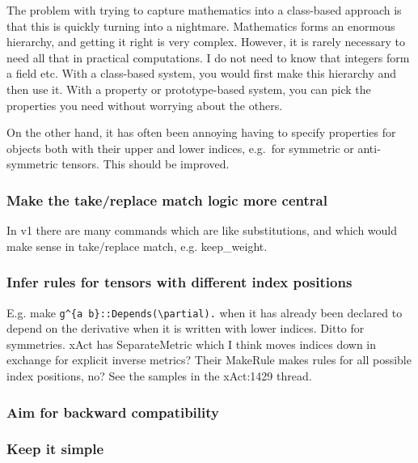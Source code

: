 \documentclass[11pt]{article}
\begin{document}
The problem with trying to capture mathematics into a class-based
approach is that this is quickly turning into a nightmare. Mathematics
forms an enormous hierarchy, and getting it right is very
complex. However, it is rarely necessary to need all that in practical
computations. I do not need to know that integers form a field
etc. With a class-based system, you would first make this hierarchy
and then use it. With a property or prototype-based system, you can
pick the properties you need without worrying about the others.



On the other hand, it has often been annoying having to specify
properties for objects both with their upper and lower indices,
e.g.~for symmetric or anti-symmetric tensors. This should be improved.

\subsubsection{Make the take/replace match logic more central}

In v1 there are many commands which are like substitutions, and which
would make sense in take/replace match, e.g. keep\_weight. 

\subsubsection{Infer rules for tensors with different index positions}

E.g. make \verb|g^{a b}::Depends(\partial).| when it has already been
declared to depend on the derivative when it is written with lower
indices. Ditto for symmetries. xAct has SeparateMetric which I think
moves indices down in exchange for explicit inverse metrics? Their
MakeRule makes rules for all possible index positions, no? See the
samples in the xAct:1429 thread.



\subsubsection{Aim for backward compatibility}


\subsubsection{Keep it simple}
\end{document}
